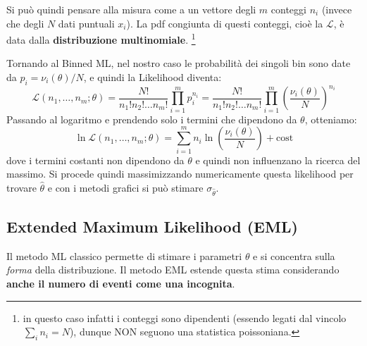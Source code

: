 \documentclass[openany,a4paper,12pt]{book}
\providecommand{\mathscr}[1]{\mathcal{#1}}
\theoremstyle{remark}
\begin{document}
Si può quindi pensare alla misura come a un vettore degli $m$ conteggi $n_i$ (invece che degli $N$ dati puntuali $x_i$). La pdf congiunta di questi conteggi, cioè la $\mathscr{L}$, è data dalla \textbf{distribuzione multinomiale}. \footnote{in questo caso infatti i conteggi sono dipendenti (essendo legati dal vincolo $\sum_i n_i = N$), dunque NON seguono una statistica poissoniana.}

\noindent{}
\vspace{0.5cm}

Tornando al Binned ML, nel nostro caso le probabilità dei singoli bin sono date da $p_i = \nu_i(\theta) / N$, e quindi la Likelihood diventa:
\begin{equation}
    \mathscr{L}(n_1, \dots, n_m ; \theta) = \frac{N!}{n_1! n_2! \dots n_m!} \prod_{i=1}^{m} p_{i}^{n_i} =  \frac{N!}{n_1! n_2! \dots n_m!} \prod_{i=1}^{m} \left( \frac{\nu_i(\theta)}{N} \right)^{n_i} 
\end{equation}
Passando al logaritmo e prendendo solo i termini che dipendono da $\theta$, otteniamo:
\begin{equation}
    \ln \mathscr{L}(n_1, \dots, n_m ; \theta) = \sum_{i=1}^{m} n_i \ln \left( \frac{\nu_i(\theta)}{N} \right) + \text{cost}
\end{equation}
dove i termini costanti non dipendono da $\theta$ e quindi non influenzano la ricerca del massimo. Si procede quindi massimizzando numericamente questa likelihood per trovare $\hat{\theta}$ e con i metodi grafici si può stimare $\sigma_{\hat{\theta}}$.

\subsection{Extended Maximum Likelihood (EML)}
Il metodo ML classico permette di stimare i parametri $\theta$ e si concentra sulla \textit{forma} della distribuzione. Il metodo EML estende questa stima considerando \textbf{anche il numero di eventi come una incognita}. 
\end{document}
